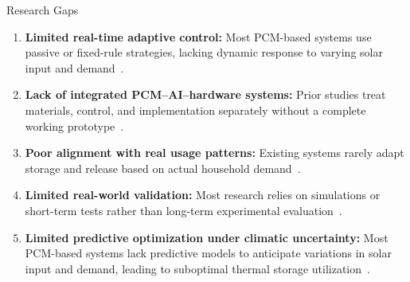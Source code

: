 \documentclass[aspectratio=169, 11pt]{beamer}
\begin{document}
\begin{frame}{Research Gaps}
\small
\begin{enumerate}
    \item \textbf{Limited real-time adaptive control:}
    Most PCM-based systems use passive or fixed-rule strategies, lacking dynamic response to varying solar input and demand~\cite{Hamza2025PCMReview, Singh2025PCMSWH}.
    \item \textbf{Lack of integrated PCM--AI--hardware systems:}
    Prior studies treat materials, control, and implementation separately without a complete working prototype~\cite{Chen2025TaguchiPCM, Liu2025AIPCM, Nems2025AIPCMReview}.
    \item \textbf{Poor alignment with real usage patterns:}
    Existing systems rarely adapt storage and release based on actual household demand~\cite{Hamza2025PCMReview, Singh2025PCMSWH}.
    \item \textbf{Limited real-world validation:}
    Most research relies on simulations or short-term tests rather than long-term experimental evaluation~\cite{Hamza2025PCMReview, Abdellatif2025PCM_Modeling}.
    \item \textbf{Limited predictive optimization under climatic uncertainty:}
    Most PCM-based systems lack predictive models to anticipate variations in solar input and demand, leading to suboptimal thermal storage utilization~\cite{Hamza2025PCMReview, Nems2025AIPCMReview, Liu2025AIPCM}.
\end{enumerate}
\end{frame}



\end{document}
